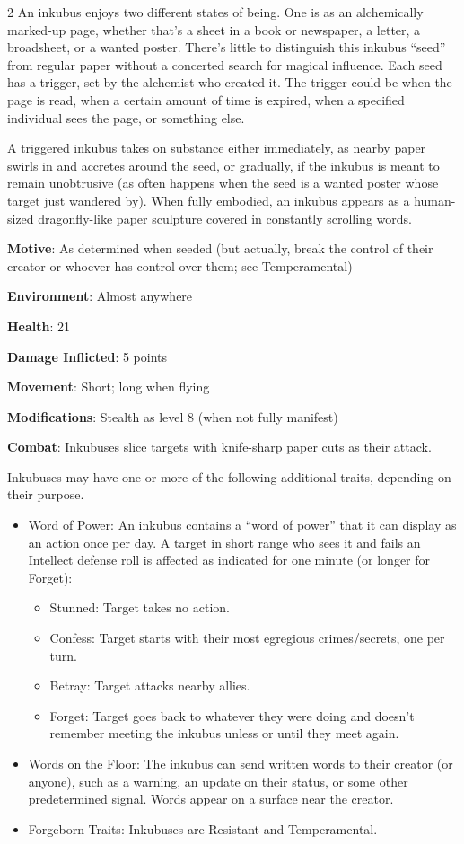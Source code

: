 \begin{multicols}{2}
An inkubus enjoys two different states of being. One is as an alchemically marked-up page, whether that’s a sheet in a book or newspaper, a letter, a broadsheet, or a wanted poster. There’s little to distinguish this inkubus “seed” from regular paper without a concerted search for magical influence. Each seed has a trigger, set by the alchemist who created it. The trigger could be when the page is read, when a certain amount of time is expired, when a specified individual sees the page, or something else. 

A triggered inkubus takes on substance either immediately, as nearby paper swirls in and accretes around the seed, or gradually, if the inkubus is meant to remain unobtrusive (as often happens when the seed is a wanted poster whose target just wandered by). 
When fully embodied, an inkubus appears as a human-sized dragonfly-like paper sculpture covered in constantly scrolling words.

\textbf{Motive}: As determined when seeded (but actually, break the control of their creator or whoever has control over them; see Temperamental) 

\textbf{Environment}: Almost anywhere 

\textbf{Health}: 21 

\textbf{Damage Inflicted}: 5 points 

\textbf{Movement}: Short; long when flying 

\textbf{Modifications}: Stealth as level 8 (when not fully manifest) 

\textbf{Combat}: Inkubuses slice targets with knife-sharp paper cuts as their attack. 

Inkubuses may have one or more of the following additional traits, depending on their purpose. 

\begin{itemize}
\item	Word of Power: An inkubus contains a “word of power” that it can display as an action once per day. A target in short range who sees it and fails an Intellect defense roll is affected as indicated for one minute (or longer for Forget): 
\begin{itemize}
\item	Stunned: Target takes no action. 
\item	Confess: Target starts with their most egregious crimes/secrets, one per turn. 
\item	Betray: Target attacks nearby allies. 
\item	Forget: Target goes back to whatever they were doing and doesn’t remember meeting the inkubus unless or until they meet again. 
\end{itemize}
\item	Words on the Floor: The inkubus can send written words to their creator (or anyone), such as a warning, an update on their status, or some other predetermined signal. Words appear on a surface near the creator. 
\item	Forgeborn Traits: Inkubuses are Resistant and Temperamental.
\end{itemize}


\end{multicols}
